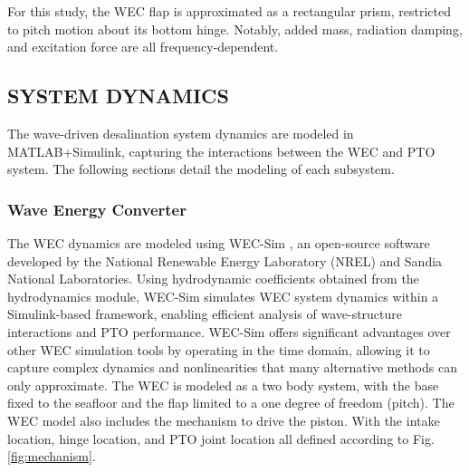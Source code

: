 \documentclass[twocolumn,10pt]{asme2e}
\begin{document}
For this study, the WEC flap is approximated as a rectangular prism, restricted to pitch motion about its bottom hinge. Notably, added mass, radiation damping, and excitation force are all frequency-dependent.


\subsection{SYSTEM DYNAMICS} \label{sec:sysdyn}

The wave-driven desalination system dynamics are modeled in MATLAB+Simulink, capturing the interactions between the WEC and PTO system. The following sections detail the modeling of each subsystem.

\subsubsection{Wave Energy Converter}

The WEC dynamics are modeled using WEC-Sim \cite{wecsim}, an open-source software developed by the National Renewable Energy Laboratory (NREL) and Sandia National Laboratories. Using hydrodynamic coefficients obtained from the hydrodynamics module, WEC-Sim simulates WEC system dynamics within a Simulink-based framework, enabling efficient analysis of wave-structure interactions and PTO performance. WEC-Sim offers significant advantages over other WEC simulation tools by operating in the time domain, allowing it to capture complex dynamics and nonlinearities that many alternative methods can only approximate. The WEC is modeled as a two body system, with the base fixed to the seafloor and the flap limited to a one degree of freedom (pitch). The WEC model also includes the mechanism to drive the piston. With the intake location, hinge location, and PTO joint location all defined according to Fig. \ref{fig:mechanism}. 

\end{document}
